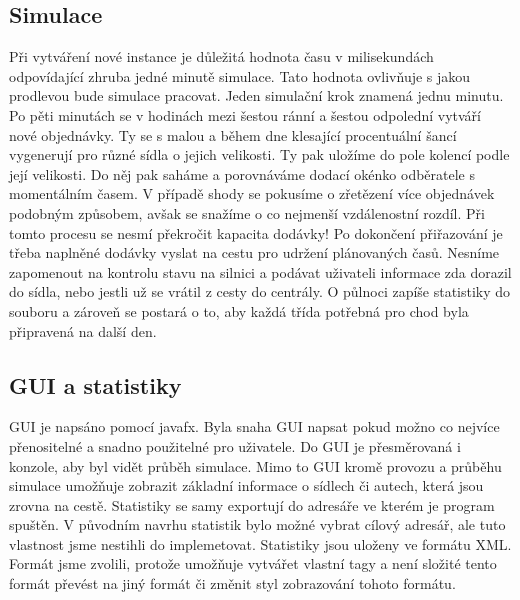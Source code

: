 \documentclass[ 12pt, a4paper]{article}
\begin{document}
\subsection{Simulace}
Při vytváření nové instance je důležitá hodnota času v milisekundách odpovídající zhruba jedné minutě simulace. Tato hodnota ovlivňuje s jakou prodlevou bude simulace pracovat. Jeden simulační krok znamená jednu minutu. Po pěti minutách se v hodinách mezi šestou ránní a šestou odpolední vytváří nové objednávky. Ty se s malou a během dne klesající procentuální šancí vygenerují pro různé sídla o jejich velikosti. Ty pak uložíme do pole kolencí podle její velikosti. Do něj pak saháme a porovnáváme dodací okénko odběratele s momentálním časem. V případě shody se pokusíme o zřetězení více objednávek podobným způsobem, avšak se snažíme o co nejmenší vzdálenostní rozdíl. Při tomto procesu se nesmí překročit kapacita dodávky!  Po dokončení přiřazování je třeba naplněné dodávky vyslat na cestu pro udržení plánovaných časů. Nesníme zapomenout na kontrolu stavu na silnici a podávat uživateli informace zda dorazil do sídla, nebo jestli už se vrátil z cesty do centrály. O půlnoci zapíše statistiky do souboru a zároveň se postará o to, aby každá třída potřebná pro chod byla připravená na další den.
\newline\newline
%
\subsection{GUI a statistiky}
GUI je napsáno pomocí javafx. Byla snaha GUI napsat pokud možno co nejvíce přenositelné a snadno použitelné pro uživatele. Do GUI je přesměrovaná i konzole, aby byl vidět průběh simulace. Mimo to GUI kromě provozu a průběhu simulace umožňuje zobrazit základní informace o sídlech či autech, která jsou zrovna na cestě.\newline
Statistiky se samy exportují do adresáře ve kterém je program spuštěn. V původním navrhu statistik bylo možné vybrat cílový adresář, ale tuto vlastnost jsme nestihli do implemetovat. Statistiky jsou uloženy ve formátu XML. Formát jsme zvolili, protože umožňuje vytvářet vlastní tagy a není složité tento formát převést na jiný formát či změnit styl zobrazování tohoto formátu.  \\
\end{document}
